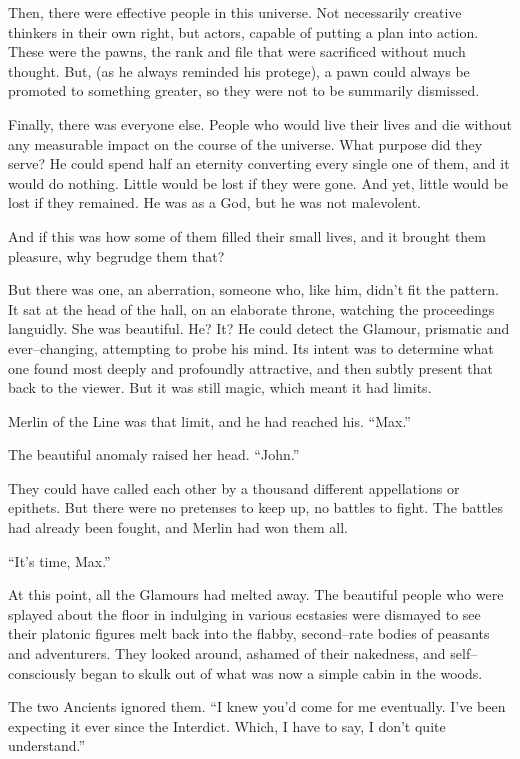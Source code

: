 Then, there were effective people in this universe. Not necessarily creative thinkers in their own right, but actors, capable of putting a plan into action. These were the pawns, the rank and file that were sacrificed without much thought. But, (as he always reminded his protege), a pawn could always be promoted to something greater, so they were not to be summarily dismissed.

Finally, there was everyone else. People who would live their lives and die without any measurable impact on the course of the universe. What purpose did they serve? He could spend half an eternity converting every single one of them, and it would do nothing. Little would be lost if they were gone. And yet, little would be lost if they remained. He was as a God, but he was not malevolent.

And if this was how some of them filled their small lives, and it brought them pleasure, why begrudge them that?

But there was one, an aberration, someone who, like him, didn’t fit the pattern. It sat at the head of the hall, on an elaborate throne, watching the proceedings languidly. She was beautiful. He? It? He could detect the Glamour, prismatic and ever\mbox{--}changing, attempting to probe his mind. Its intent was to determine what one found most deeply and profoundly attractive, and then subtly present that back to the viewer. But it was still magic, which meant it had limits.

Merlin of the Line was that limit, and he had reached his. “Max.”

The beautiful anomaly raised her head. “John.”

They could have called each other by a thousand different appellations or epithets. But there were no pretenses to keep up, no battles to fight. The battles had already been fought, and Merlin had won them all.

“It’s time, Max.”

At this point, all the Glamours had melted away. The beautiful people who were splayed about the floor in indulging in various ecstasies were dismayed to see their platonic figures melt back into the flabby, second\mbox{--}rate bodies of peasants and adventurers. They looked around, ashamed of their nakedness, and self\mbox{--}consciously began to skulk out of what was now a simple cabin in the woods.

The two Ancients ignored them. “I knew you’d come for me eventually. I’ve been expecting it ever since the Interdict. Which, I have to say, I don’t quite understand.”

